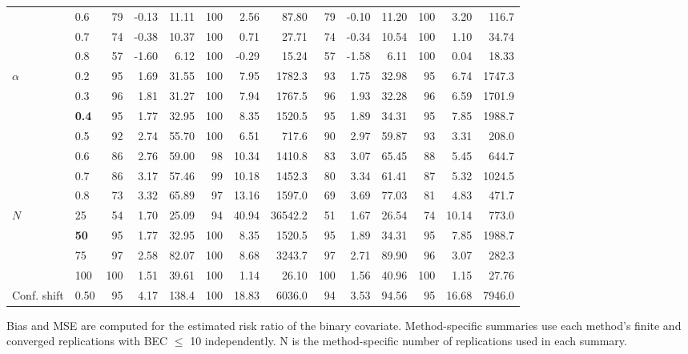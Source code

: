 \begin{table}[htbp]
\begin{tabular}{ll|rrr|rrr|rrr|rrr}
 & 0.6 & 79 & -0.13 & 11.11 & 100 & 2.56 & 87.80 & 79 & -0.10 & 11.20 & 100 & 3.20 & 116.7 \\
 & 0.7 & 74 & -0.38 & 10.37 & 100 & 0.71 & 27.71 & 74 & -0.34 & 10.54 & 100 & 1.10 & 34.74 \\
 & 0.8 & 57 & -1.60 & 6.12 & 100 & -0.29 & 15.24 & 57 & -1.58 & 6.11 & 100 & 0.04 & 18.33 \\
\hline
$\alpha$ & 0.2 & 95 & 1.69 & 31.55 & 100 & 7.95 & 1782.3 & 93 & 1.75 & 32.98 & 95 & 6.74 & 1747.3 \\
 & 0.3 & 96 & 1.81 & 31.27 & 100 & 7.94 & 1767.5 & 96 & 1.93 & 32.28 & 96 & 6.59 & 1701.9 \\
 & \textbf{0.4} & 95 & 1.77 & 32.95 & 100 & 8.35 & 1520.5 & 95 & 1.89 & 34.31 & 95 & 7.85 & 1988.7 \\
 & 0.5 & 92 & 2.74 & 55.70 & 100 & 6.51 & 717.6 & 90 & 2.97 & 59.87 & 93 & 3.31 & 208.0 \\
 & 0.6 & 86 & 2.76 & 59.00 & 98 & 10.34 & 1410.8 & 83 & 3.07 & 65.45 & 88 & 5.45 & 644.7 \\
 & 0.7 & 86 & 3.17 & 57.46 & 99 & 10.18 & 1452.3 & 80 & 3.34 & 61.41 & 87 & 5.32 & 1024.5 \\
 & 0.8 & 73 & 3.32 & 65.89 & 97 & 13.16 & 1597.0 & 69 & 3.69 & 77.03 & 81 & 4.83 & 471.7 \\
\hline
$N$ & 25 & 54 & 1.70 & 25.09 & 94 & 40.94 & 36542.2 & 51 & 1.67 & 26.54 & 74 & 10.14 & 773.0 \\
 & \textbf{50} & 95 & 1.77 & 32.95 & 100 & 8.35 & 1520.5 & 95 & 1.89 & 34.31 & 95 & 7.85 & 1988.7 \\
 & 75 & 97 & 2.58 & 82.07 & 100 & 8.68 & 3243.7 & 97 & 2.71 & 89.90 & 96 & 3.07 & 282.3 \\
 & 100 & 100 & 1.51 & 39.61 & 100 & 1.14 & 26.10 & 100 & 1.56 & 40.96 & 100 & 1.15 & 27.76 \\
\hline
Conf. shift & 0.50 & 95 & 4.17 & 138.4 & 100 & 18.83 & 6036.0 & 94 & 3.53 & 94.56 & 95 & 16.68 & 7946.0 \\
\hline
\end{tabular}
\begin{flushleft}
\footnotesize Bias and MSE are computed for the estimated risk ratio of the binary covariate. Method-specific summaries use each method's finite and converged replications with BEC $\leq$ 10 independently. N is the method-specific number of replications used in each summary.
\end{flushleft}
\end{table}
